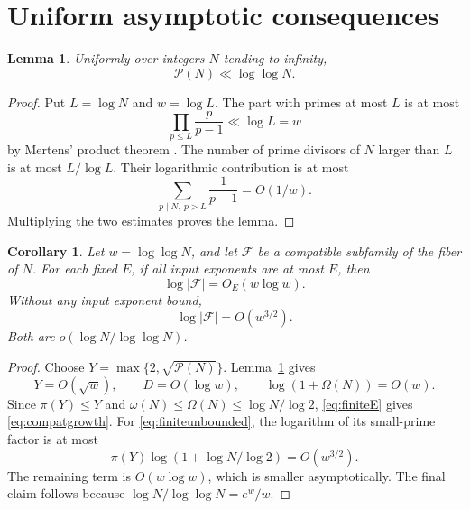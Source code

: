 \documentclass[11pt]{article}
\newtheorem{lemma}[theorem]{Lemma}
\newtheorem{corollary}[theorem]{Corollary}
\newcommand{\PP}{\mathcal P}
\newcommand{\FF}{\mathcal F}
\begin{document}
\section{Uniform asymptotic consequences}
\begin{lemma}\label{lem:mertens}
Uniformly over integers $N$ tending to infinity,
\[
 \PP(N)\ll\log\log N.
\]
\end{lemma}
\begin{proof}
Put $L=\log N$ and $w=\log L$. The part with primes at most $L$ is at most
\[
 \prod_{p\le L}\frac p{p-1}\ll\log L=w
\]
by Mertens' product theorem \cite{mertens}. The number of prime divisors of $N$ larger than $L$ is at most $L/\log L$. Their logarithmic contribution is at most
\[
 \sum_{p\mid N,\ p>L}\frac1{p-1}=O(1/w).
\]
Multiplying the two estimates proves the lemma.
\end{proof}

\begin{corollary}\label{cor:compatible}
Let $w=\log\log N$, and let $\FF$ be a compatible subfamily of the fiber of $N$.
For each fixed $E$, if all input exponents are at most $E$, then
\begin{equation}\label{eq:compatgrowth}
 \log|\FF|=O_E(w\log w).
\end{equation}
Without any input exponent bound,
\[
 \log|\FF|=O(w^{3/2}).
\]
Both are $o(\log N/\log\log N)$.
\end{corollary}
\begin{proof}
Choose $Y=\max\{2,\sqrt{\PP(N)}\}$. Lemma~\ref{lem:mertens} gives
\[
 Y=O(\sqrt w),\qquad D=O(\log w),\qquad
 \log(1+\Omega(N))=O(w).
\]
Since $\pi(Y)\le Y$ and $\omega(N)\le\Omega(N)\le\log N/\log2$, \eqref{eq:finiteE} gives \eqref{eq:compatgrowth}. For \eqref{eq:finiteunbounded}, the logarithm of its small-prime factor is at most
\[
 \pi(Y)\log(1+\log N/\log2)=O(w^{3/2}).
\]
The remaining term is $O(w\log w)$, which is smaller asymptotically. The final claim follows because $\log N/\log\log N=e^w/w$.
\end{proof}
\end{document}

